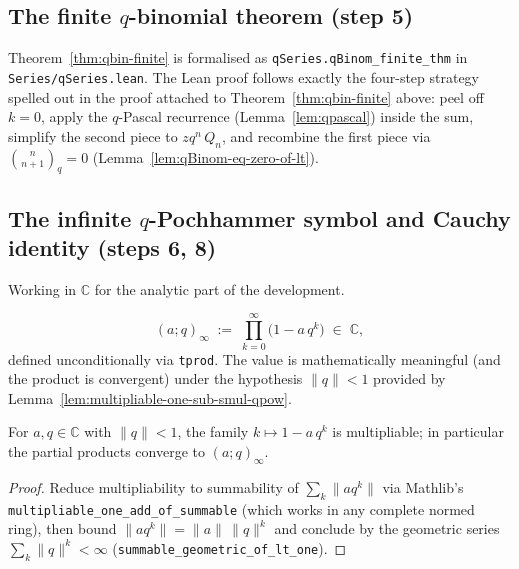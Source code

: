 \subsection{The finite $q$-binomial theorem (step 5)}\label{subsec:qbin-finite-formalized}

Theorem~\ref{thm:qbin-finite} is formalised as
\texttt{qSeries.qBinom\_finite\_thm} in \texttt{Series/qSeries.lean}.
The Lean proof follows exactly the four-step strategy spelled out in
the proof attached to Theorem~\ref{thm:qbin-finite} above:
peel off $k = 0$, apply the $q$-Pascal recurrence
(Lemma~\ref{lem:qpascal}) inside the sum, simplify the second piece
to $z q^n\, Q_n$, and recombine the first piece via
$\binom{n}{n+1}_q = 0$ (Lemma~\ref{lem:qBinom-eq-zero-of-lt}).

\subsection{The infinite $q$-Pochhammer symbol and Cauchy identity (steps 6, 8)}\label{subsec:qbin-infinite-formalized}

Working in $\mathbb{C}$ for the analytic part of the development.

\begin{definition}\label{def:qPochhammerInf}\leanok
\[
  (a; q)_\infty \;:=\; \prod_{k=0}^{\infty}\bigl(1 - a\, q^k\bigr) \;\in\; \mathbb{C},
\]
defined unconditionally via \texttt{tprod}. The value is mathematically
meaningful (and the product is convergent) under the hypothesis $\|q\| < 1$
provided by Lemma~\ref{lem:multipliable-one-sub-smul-qpow}.
\end{definition}

\begin{lemma}[Multipliability]\label{lem:multipliable-one-sub-smul-qpow}\leanok{}
For $a, q \in \mathbb{C}$ with $\|q\| < 1$, the family
$k \mapsto 1 - a\, q^k$ is multipliable; in particular the partial
products converge to $(a; q)_\infty$.
\end{lemma}

\begin{proof}\leanok
Reduce multipliability to summability of $\sum_k \|a q^k\|$ via Mathlib's
\texttt{multipliable\_one\_add\_of\_summable} (which works in any complete
normed ring), then bound $\|a q^k\| = \|a\|\, \|q\|^k$ and conclude by the
geometric series $\sum_k \|q\|^k < \infty$
(\texttt{summable\_geometric\_of\_lt\_one}).
\end{proof}

